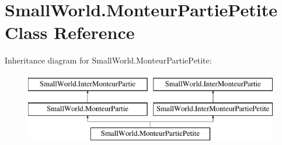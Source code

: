 \hypertarget{class_small_world_1_1_monteur_partie_petite}{\section{Small\-World.\-Monteur\-Partie\-Petite Class Reference}
\label{class_small_world_1_1_monteur_partie_petite}
}
Inheritance diagram for Small\-World.\-Monteur\-Partie\-Petite\-:\begin{figure}[H]
\begin{center}
\leavevmode
\includegraphics[height=3.000000cm]{class_small_world_1_1_monteur_partie_petite}
\end{center}
\end{figure}
